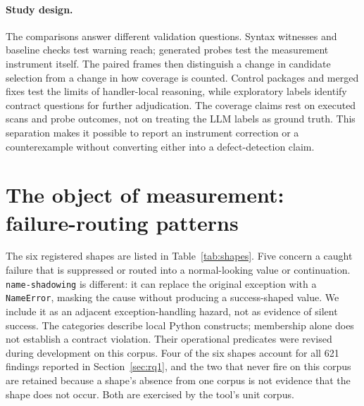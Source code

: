\documentclass[10pt,a4paper]{article}
\begin{document}
\paragraph{Study design.}
The comparisons answer different validation questions. Syntax witnesses
and baseline checks test warning reach; generated probes test the
measurement instrument itself. The paired frames then distinguish a
change in candidate selection from a change in how coverage is counted.
Control packages and merged fixes test the limits of handler-local
reasoning, while exploratory labels identify contract questions for
further adjudication. The coverage claims rest on executed scans and
probe outcomes, not on treating the LLM labels as ground truth. This
separation makes it possible to report an instrument correction or a
counterexample without converting either into a defect-detection claim.

\section{The object of measurement: failure-routing patterns}
\label{sec:family}

The six registered shapes are listed in Table~\ref{tab:shapes}. Five concern a
caught failure that is suppressed or routed into a normal-looking value or
continuation. \texttt{name-shadowing} is different: it can replace the original
exception with a \texttt{NameError}, masking the cause without producing a
success-shaped value. We include it as an adjacent exception-handling hazard,
not as evidence of silent success. The categories describe local Python
constructs; membership alone does not establish a contract violation.
Their operational predicates were revised during development on this corpus.
Four of the six shapes account for all 621 findings
reported in Section~\ref{sec:rq1}, and the two that never fire on this corpus are
retained because a shape's absence from one corpus is not evidence that the shape
does not occur. Both are exercised by the tool's unit corpus.
\end{document}
